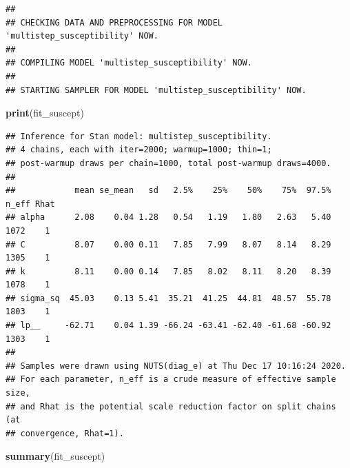 \documentclass[
]{article}
\newenvironment{Shaded}{\begin{snugshade}}{\end{snugshade}}
\newcommand{\KeywordTok}[1]{\textcolor[rgb]{0.13,0.29,0.53}{\textbf{#1}}}
\newcommand{\NormalTok}[1]{#1}
\begin{document}
\begin{verbatim}
## 
## CHECKING DATA AND PREPROCESSING FOR MODEL 'multistep_susceptibility' NOW.
## 
## COMPILING MODEL 'multistep_susceptibility' NOW.
## 
## STARTING SAMPLER FOR MODEL 'multistep_susceptibility' NOW.
\end{verbatim}

\begin{Shaded}
\begin{Highlighting}[]
\KeywordTok{print}\NormalTok{(fit_suscept)}
\end{Highlighting}
\end{Shaded}

\begin{verbatim}
## Inference for Stan model: multistep_susceptibility.
## 4 chains, each with iter=2000; warmup=1000; thin=1; 
## post-warmup draws per chain=1000, total post-warmup draws=4000.
## 
##            mean se_mean   sd   2.5%    25%    50%    75%  97.5% n_eff Rhat
## alpha      2.08    0.04 1.28   0.54   1.19   1.80   2.63   5.40  1072    1
## C          8.07    0.00 0.11   7.85   7.99   8.07   8.14   8.29  1305    1
## k          8.11    0.00 0.14   7.85   8.02   8.11   8.20   8.39  1078    1
## sigma_sq  45.03    0.13 5.41  35.21  41.25  44.81  48.57  55.78  1803    1
## lp__     -62.71    0.04 1.39 -66.24 -63.41 -62.40 -61.68 -60.92  1303    1
## 
## Samples were drawn using NUTS(diag_e) at Thu Dec 17 10:16:24 2020.
## For each parameter, n_eff is a crude measure of effective sample size,
## and Rhat is the potential scale reduction factor on split chains (at 
## convergence, Rhat=1).
\end{verbatim}

\begin{Shaded}
\begin{Highlighting}[]
\KeywordTok{summary}\NormalTok{(fit_suscept)}
\end{Highlighting}
\end{Shaded}
\end{document}
